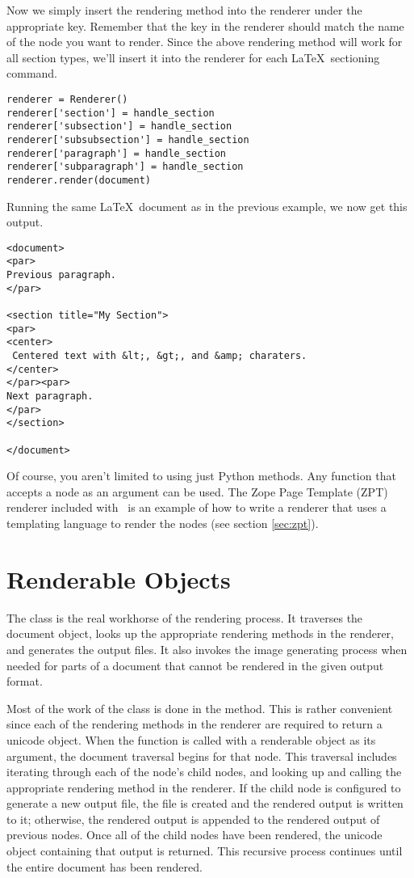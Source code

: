 Now we simply insert the rendering method into the renderer under the
appropriate key.  Remember that the key in the renderer should match
the name of the node you want to render.  Since the above rendering 
method will work for all section types, we'll insert it into the 
renderer for each \LaTeX\ sectioning command.
\begin{verbatim}
renderer = Renderer()
renderer['section'] = handle_section
renderer['subsection'] = handle_section
renderer['subsubsection'] = handle_section
renderer['paragraph'] = handle_section
renderer['subparagraph'] = handle_section
renderer.render(document)
\end{verbatim}

Running the same \LaTeX\ document as in the previous example, we now get
this output.
\begin{verbatim}
<document>
<par>
Previous paragraph.
</par>

<section title="My Section">
<par>
<center>
 Centered text with &lt;, &gt;, and &amp; charaters.
</center>
</par><par>
Next paragraph.
</par>
</section>

</document>
\end{verbatim}

Of course, you aren't limited to using just Python methods.  Any function
that accepts a node as an argument can be used.  The 
Zope Page Template (ZPT) renderer included with \plasTeX\ is an example 
of how to write a renderer that uses a templating language to render
the nodes (see section \ref{sec:zpt}).


\section{Renderable Objects\label{sec:renderable}}

The  class is the real workhorse of the rendering process.
It traverses the document object, looks up the appropriate rendering
methods in the renderer, and generates the output files.  It also 
invokes the image generating process when needed for parts of a document
that cannot be rendered in the given output format.

Most of the work of the  class is done in the 
 method.  This is rather convenient since each of
the rendering methods in the renderer are required to return a unicode
object.  When the  function is called with a renderable
object as its argument, the document traversal begins for that node.
This traversal includes iterating through each of the node's child nodes, and
looking up and calling the appropriate rendering method in the renderer.
If the child node is configured to generate a new output file, the 
file is created and the rendered output is written to it; otherwise,
the rendered output is appended to the rendered output of previous nodes.
Once all of the child nodes have been rendered, the unicode object containing
that output is returned.  This recursive process continues until the 
entire document has been rendered.

